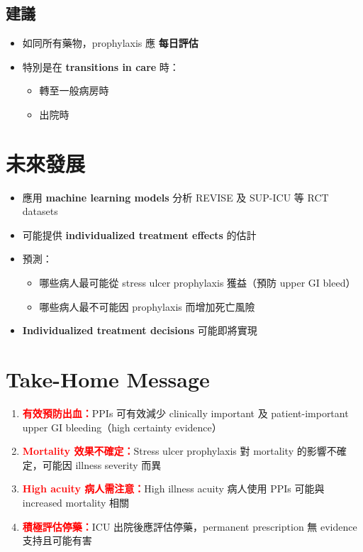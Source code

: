 \documentclass[12pt,a4paper]{article}
\begin{document}
\subsection{建議}

\begin{itemize}
    \item 如同所有藥物，prophylaxis 應 \textbf{每日評估}
    \item 特別是在 \textbf{transitions in care} 時：
    \begin{itemize}
        \item 轉至一般病房時
        \item 出院時
    \end{itemize}
\end{itemize}

\section{未來發展}

\begin{itemize}
    \item 應用 \textbf{machine learning models} 分析 REVISE 及 SUP-ICU 等 RCT datasets
    \item 可能提供 \textbf{individualized treatment effects} 的估計
    \item 預測：
    \begin{itemize}
        \item 哪些病人最可能從 stress ulcer prophylaxis 獲益（預防 upper GI bleed）
        \item 哪些病人最不可能因 prophylaxis 而增加死亡風險
    \end{itemize}
    \item \textbf{Individualized treatment decisions} 可能即將實現
\end{itemize}

\section{Take-Home Message}

\begin{enumerate}
    \item \textcolor{red}{\textbf{有效預防出血：}}PPIs 可有效減少 clinically important 及 patient-important upper GI bleeding（high certainty evidence）
    \item \textcolor{red}{\textbf{Mortality 效果不確定：}}Stress ulcer prophylaxis 對 mortality 的影響不確定，可能因 illness severity 而異
    \item \textcolor{red}{\textbf{High acuity 病人需注意：}}High illness acuity 病人使用 PPIs 可能與 increased mortality 相關
    \item \textcolor{red}{\textbf{積極評估停藥：}}ICU 出院後應評估停藥，permanent prescription 無 evidence 支持且可能有害
\end{enumerate}
\end{document}
